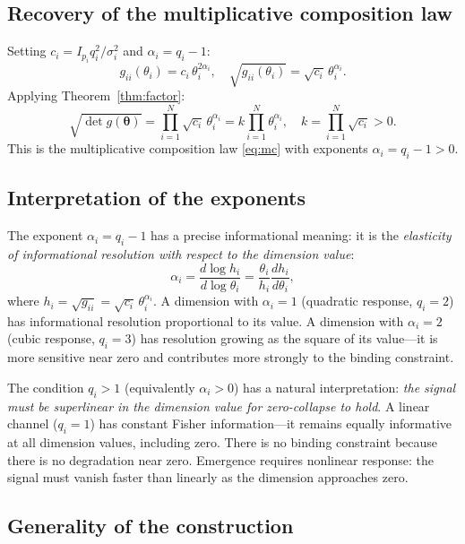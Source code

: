 \documentclass[12pt, a4paper]{article}
\theoremstyle{definition}
\theoremstyle{remark}
\begin{document}
\subsection{Recovery of the multiplicative composition law}

Setting $c_i = I_{p_i} q_i^2 / \sigma_i^2$ and $\alpha_i = q_i - 1$:
\begin{equation}\label{eq:fisherpower2}
g_{ii}(\theta_i) = c_i \, \theta_i^{2\alpha_i}, \quad \sqrt{g_{ii}(\theta_i)} = \sqrt{c_i} \, \theta_i^{\alpha_i}.
\end{equation}
Applying Theorem~\ref{thm:factor}:
\begin{equation}\label{eq:recovery}
\sqrt{\det g(\boldsymbol{\theta})} = \prod_{i=1}^{N} \sqrt{c_i} \, \theta_i^{\alpha_i} = k \prod_{i=1}^{N} \theta_i^{\alpha_i}, \quad k = \prod_{i=1}^{N} \sqrt{c_i} > 0.
\end{equation}
This is the multiplicative composition law \eqref{eq:mc} with exponents $\alpha_i = q_i - 1 > 0$.

\subsection{Interpretation of the exponents}

The exponent $\alpha_i = q_i - 1$ has a precise informational meaning: it is the \textit{elasticity of informational resolution with respect to the dimension value}:
\[
\alpha_i = \frac{d \log h_i}{d \log \theta_i} = \frac{\theta_i}{h_i} \frac{dh_i}{d\theta_i},
\]
where $h_i = \sqrt{g_{ii}} = \sqrt{c_i} \, \theta_i^{\alpha_i}$. A dimension with $\alpha_i = 1$ (quadratic response, $q_i = 2$) has informational resolution proportional to its value. A dimension with $\alpha_i = 2$ (cubic response, $q_i = 3$) has resolution growing as the square of its value---it is more sensitive near zero and contributes more strongly to the binding constraint.

The condition $q_i > 1$ (equivalently $\alpha_i > 0$) has a natural interpretation: \textit{the signal must be superlinear in the dimension value for zero-collapse to hold}. A linear channel ($q_i = 1$) has constant Fisher information---it remains equally informative at all dimension values, including zero. There is no binding constraint because there is no degradation near zero. Emergence requires nonlinear response: the signal must vanish faster than linearly as the dimension approaches zero.

\subsection{Generality of the construction}
\end{document}
